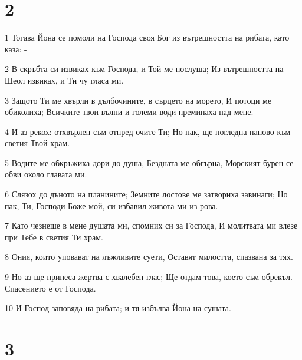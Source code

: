 \chapter{2}

\par 1 Тогава Йона се помоли на Господа своя Бог из вътрешността на рибата, като каза: -
\par 2 В скръбта си извиках към Господа, и Той ме послуша; Из вътрешността на Шеол извиках, и Ти чу гласа ми.
\par 3 Защото Ти ме хвърли в дълбочините, в сърцето на морето, И потоци ме обиколиха; Всичките твои вълни и големи води преминаха над мене.
\par 4 И аз рекох: отхвърлен съм отпред очите Ти; Но пак, ще погледна наново към светия Твой храм.
\par 5 Водите ме обкръжиха дори до душа, Бездната ме обгърна, Морският бурен се обви около главата ми.
\par 6 Слязох до дъното на планините; Земните лостове ме затвориха завинаги; Но пак, Ти, Господи Боже мой, си избавил живота ми из рова.
\par 7 Като чезнеше в мене душата ми, спомних си за Господа, И молитвата ми влезе при Тебе в светия Ти храм.
\par 8 Ония, които уповават на лъжливите суети, Оставят милостта, спазвана за тях.
\par 9 Но аз ще принеса жертва с хвалебен глас; Ще отдам това, което съм обрекъл. Спасението е от Господа.
\par 10 И Господ заповяда на рибата; и тя избълва Йона на сушата.

\chapter{3}

